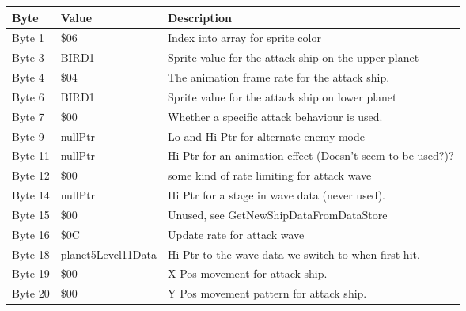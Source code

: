 \begin{figure}[H]
  {
  \setlength{\tabcolsep}{3.0pt}
  \setlength\cmidrulewidth{\heavyrulewidth} %
  \begin{adjustbox}{width=12cm}

\begin{tabular}{lll}
\toprule
 Byte    & Value                      & Description                                                        \\
\midrule
 Byte 1  & \$06                        & Index into array for sprite color                                  \\
 Byte 3  & BIRD1                      & Sprite value for the attack ship on the upper planet               \\
 Byte 4  & \$04                        & The animation frame rate for the attack ship.                      \\
 Byte 6  & BIRD1                      & Sprite value for the attack ship on lower planet                   \\
 Byte 7  & \$00                        & Whether a specific attack behaviour is used.                       \\
 Byte 9  & nullPtr                    & Lo and Hi Ptr for alternate enemy mode                             \\
 Byte 11 & nullPtr                    & Hi Ptr for an animation effect (Doesn't seem to be used?)?         \\
 Byte 12 & \$00                        & some kind of rate limiting for attack wave                         \\
 Byte 14 & nullPtr                    & Hi Ptr for a stage in wave data (never used).                      \\
 Byte 15 & \$00                        & Unused, see GetNewShipDataFromDataStore                            \\
 Byte 16 & \$0C                        & Update rate for attack wave                                        \\
 Byte 18 & planet5Level11Data         & Hi Ptr to the wave data we switch to when first hit.               \\
 Byte 19 & \$00                        & X Pos movement for attack ship.                                    \\
 Byte 20 & \$00                        & Y Pos movement pattern for attack ship.                            \\

\end{tabular}
\end{adjustbox}}
\end{figure}
